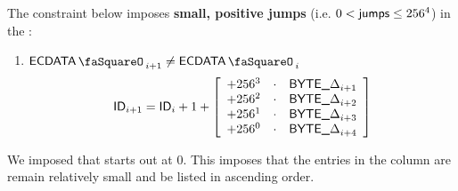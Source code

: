The constraint below imposes \textbf{small, positive jumps} (i.e. $0 < \textsf{jumps} \leq 256^{4}$) in the \ecdataId:
\begin{enumerate}
    \item \If $\ecDataStamp_{i + 1} \neq \ecDataStamp_i$ \Then
	\[
	    \textsf{ID}_{i + 1} = \textsf{ID}_{i} + 1 +
	    \left[ \begin{array}{rcr}
		+ 256 ^ {3} &\cdot& \textsf{BYTE}\textsf{\_$\Delta$}_{i + 1} \\
		+ 256 ^ {2} &\cdot& \textsf{BYTE}\textsf{\_$\Delta$}_{i + 2} \\
		+ 256 ^ {1} &\cdot& \textsf{BYTE}\textsf{\_$\Delta$}_{i + 3} \\
		+ 256 ^ {0} &\cdot& \textsf{BYTE}\textsf{\_$\Delta$}_{i + 4} \\
	    \end{array} \right]
	\]
\end{enumerate}
\saNote{} We imposed that \ecdataId{} starts out at $0$. This imposes that the entries in the \ecdataId{} column are remain relatively small and be listed in ascending order.
